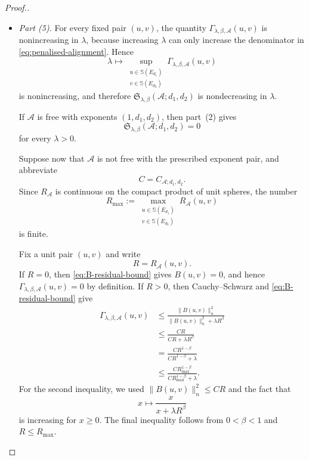 \documentclass[10pt,a4paper]{amsart}
\begin{document}
\begin{proof}[Proof.]
\begin{itemize}
\item \emph{Part (5).}
For every fixed pair $(u,v)$, the quantity
$\Gamma_{\lambda,\beta,\mathcal{A}}(u,v)$ is nonincreasing in $\lambda$,
because increasing $\lambda$ can only increase the denominator in
\eqref{eq:penalised-alignment}. Hence
\[
\lambda
\longmapsto
\sup_{\substack{u\in\mathbb S(E_{d_1})\\
v\in\mathbb S(E_{d_2})}}
\Gamma_{\lambda,\beta,\mathcal{A}}(u,v)
\]
is nonincreasing, and therefore
$\mathfrak S_{\lambda,\beta}(\mathcal{A};d_1,d_2)$ is nondecreasing in
$\lambda$.

If $\mathcal{A}$ is free with exponents $(1,d_1,d_2)$, then part~(2) gives
\[
\mathfrak S_{\lambda,\beta}(\mathcal{A};d_1,d_2)=0
\]
for every $\lambda>0$.

Suppose now that $\mathcal{A}$ is not free with the prescribed exponent pair,
and abbreviate
\[
C=C_{\mathcal{A};d_1,d_2}.
\]
Since $R_{\mathcal{A}}$ is continuous on the compact product of unit spheres,
the number
\[
R_{\max}
:=
\max_{\substack{u\in\mathbb S(E_{d_1})\\
v\in\mathbb S(E_{d_2})}}
R_{\mathcal{A}}(u,v)
\]
is finite.

Fix a unit pair $(u,v)$ and write
\[
R=R_{\mathcal{A}}(u,v).
\]
If $R=0$, then \eqref{eq:B-residual-bound} gives $B(u,v)=0$, and hence
$\Gamma_{\lambda,\beta,\mathcal{A}}(u,v)=0$ by definition. If $R>0$, then
Cauchy--Schwarz and \eqref{eq:B-residual-bound} give
\begin{align*}
\Gamma_{\lambda,\beta,\mathcal{A}}(u,v)
&\leq
\frac{\|B(u,v)\|_n^2}
{\|B(u,v)\|_n^2+\lambda R^\beta}\\
&\leq
\frac{CR}{CR+\lambda R^\beta}\\
&=
\frac{CR^{1-\beta}}
{CR^{1-\beta}+\lambda}\\
&\leq
\frac{CR_{\max}^{1-\beta}}
{CR_{\max}^{1-\beta}+\lambda}.
\end{align*}
For the second inequality, we used
$\|B(u,v)\|_n^2\leq CR$ and the fact that
\[
x\longmapsto\frac{x}{x+\lambda R^\beta}
\]
is increasing for $x\geq0$. The final inequality follows from
$0<\beta<1$ and $R\leq R_{\max}$.


\end{itemize}
\end{proof}
\end{document}
